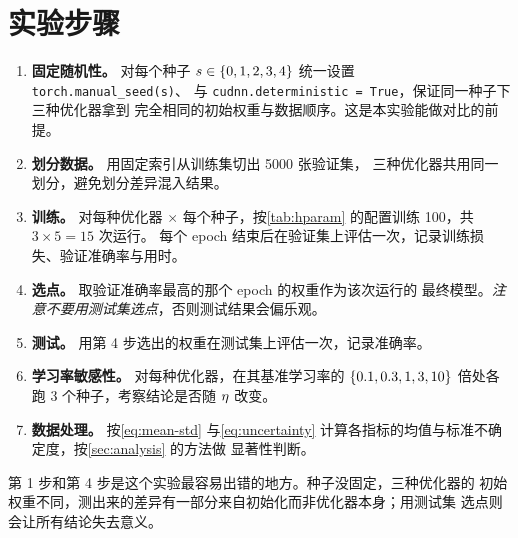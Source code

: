 \section{实验步骤}
\label{sec:procedure}

\begin{enumerate}
  \item \textbf{固定随机性。} 对每个种子 $s \in \{0,1,2,3,4\}$ 统一设置
        \lstinline|torch.manual_seed(s)|、 与
        \lstinline|cudnn.deterministic = True|，保证同一种子下三种优化器拿到
        完全相同的初始权重与数据顺序。这是本实验能做对比的前提。

  \item \textbf{划分数据。} 用固定索引从训练集切出 \num{5000} 张验证集，
        三种优化器共用同一划分，避免划分差异混入结果。

  \item \textbf{训练。} 对每种优化器 $\times$ 每个种子，按\cref{tab:hparam}
        的配置训练 \qty{100}{\epoch}，共 $3 \times 5 = 15$ 次运行。
        每个 epoch 结束后在验证集上评估一次，记录训练损失、验证准确率与用时。

  \item \textbf{选点。} 取验证准确率最高的那个 epoch 的权重作为该次运行的
        最终模型。\emph{注意不要用测试集选点}，否则测试结果会偏乐观。

  \item \textbf{测试。} 用第 4 步选出的权重在测试集上评估一次，记录准确率。

  \item \textbf{学习率敏感性。} 对每种优化器，在其基准学习率的
        $\{0.1, 0.3, 1, 3, 10\}$ 倍处各跑 3 个种子，考察结论是否随
        $\eta$ 改变。

  \item \textbf{数据处理。} 按\cref{eq:mean-std} 与\cref{eq:uncertainty}
        计算各指标的均值与标准不确定度，按\cref{sec:analysis} 的方法做
        显著性判断。
\end{enumerate}

\begin{caution}
  第 1 步和第 4 步是这个实验最容易出错的地方。种子没固定，三种优化器的
  初始权重不同，测出来的差异有一部分来自初始化而非优化器本身；用测试集
  选点则会让所有结论失去意义。
\end{caution}
